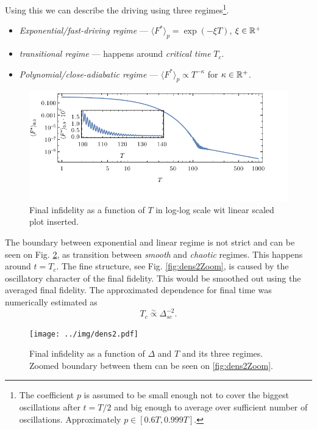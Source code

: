 Using this we can describe the driving using three regimes\footnote{The coefficient $p$ is assumed to be small enough not to cover the biggest oscillations after $t=T/2$ and big enough to average over sufficient number of oscillations. Approximately $p\in[0.6T,0.999T]$.}.
\begin{itemize}
    \item \emph{Exponential/fast-driving regime} — $\langle F^*\rangle_p= \exp(-\xi T)$, $\xi\in\mathbb{R}^+$
    \item \emph{transitional regime} — happens around \emph{critical time} $T_c$.
    \item \emph{Polynomial/close-adiabatic regime} — $\langle F^*\rangle_p\propto T^{-\kappa}$ for $\kappa\in \mathbb{R}^+$.
\end{itemize}

\begin{figure}[H]
    \centering
    \includegraphics[scale=1.2]{../img/infidCombined1.pdf}
    \caption{Final infidelity as a function of $T$ in log-log scale wit linear scaled plot inserted.}
    \label{fig:infidCombined}
\end{figure}



The boundary between exponential and linear regime is not strict and can be seen on Fig. \ref{fig:dens2}, as transition between \emph{smooth} and \emph{chaotic} regimes. This happens around $t=T_c$. The fine structure, see Fig. \ref{fig:dens2Zoom}, is caused by the oscillatory character of the final fidelity. This would be smoothed out using the averaged final fidelity. The approximated dependence for final time was numerically estimated as
\begin{equation}
    T_c\overset{\sim}{\propto} \Delta_{sc}^{-2}.
\end{equation}


\begin{figure}[H]
    \centering 
    \texttt{[image: ../img/dens2.pdf]}
    \caption{Final infidelity as a function of $\Delta$ and $T$ and its three regimes. Zoomed boundary between them can be seen on \ref{fig:dens2Zoom}.}
    \label{fig:dens2}
\end{figure}

